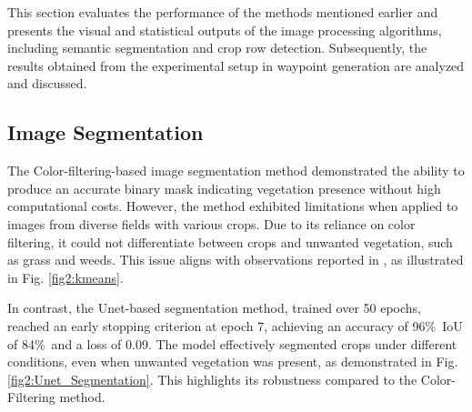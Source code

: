 \documentclass[conference]{IEEEtran}
\begin{document}
	This section evaluates the performance of the methods mentioned earlier and presents the visual and statistical outputs of the image processing algorithms, including semantic segmentation and crop row detection. Subsequently, the results obtained from the experimental setup in waypoint generation are analyzed and discussed.
	\subsection{Image Segmentation}
	
	The Color-filtering-based image segmentation method demonstrated the ability to produce an accurate binary mask indicating vegetation presence without high computational costs. However, the method exhibited limitations when applied to images from diverse fields with various crops. Due to its reliance on color filtering, it could not differentiate between crops and unwanted vegetation, such as grass and weeds. This issue aligns with observations reported in \cite{b5}, as illustrated in Fig.
	\ref{fig2:kmeans}.
	
	
	In contrast, the Unet-based segmentation method, trained over 50 epochs, reached an early stopping criterion at epoch 7, achieving an accuracy of 96\%\, IoU of 84\%\ and a loss of 0.09. The model effectively segmented crops under different conditions, even when unwanted vegetation was present, as demonstrated in Fig.
	\ref{fig2:Unet_Segmentation}.
	This highlights its robustness compared to the Color-Filtering method.
	
\end{document}
